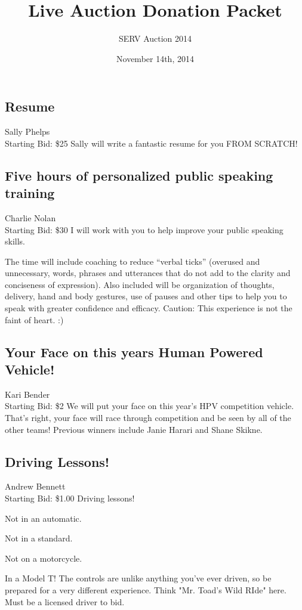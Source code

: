 \documentclass[11pt]{article}
\title{Live Auction Donation Packet}
\author{SERV Auction 2014}
\date{November 14th, 2014}
\begin{document}
\maketitle
\subsection{Resume}
Sally Phelps
\\
Starting Bid: \$25
\newline
Sally will write a fantastic resume for you FROM SCRATCH!
\subsection{Five hours of personalized public speaking training}
Charlie Nolan
\\
Starting Bid: \$30
\newline
I will work with you to help improve your public speaking skills.
 
The time will include coaching to reduce “verbal ticks” (overused and unnecessary, words, phrases and utterances that do not add to the clarity and conciseness of expression). Also included will be organization of thoughts, delivery, hand and body gestures, use of pauses and other tips to help you to speak with greater confidence and efficacy. Caution: This experience is not the faint of heart. :)
\subsection{Your Face on this years Human Powered Vehicle!}
Kari Bender
\\
Starting Bid: \$2
\newline
We will put your face on this year's HPV competition vehicle. That's right, your face will race through competition and be seen by all of the other teams! Previous winners include Janie Harari and Shane Skikne.
\subsection{Driving Lessons!}
Andrew Bennett
\\
Starting Bid: \$1.00
\newline
Driving lessons!

Not in an automatic.

Not in a standard.

Not on a motorcycle.

In a Model T!  The controls are unlike anything you've ever driven, so be prepared for a very different experience.  Think "Mr. Toad's Wild RIde" here.  Must be a licensed driver to bid.
\end{document}
